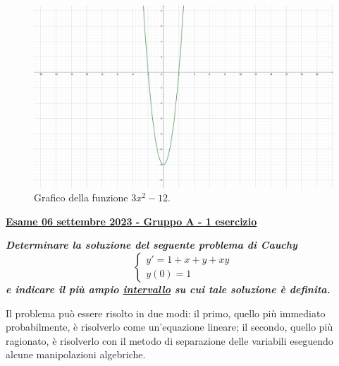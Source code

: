 \documentclass[a4paper]{article}
\newcommand{\definition}[1]{\textcolor{Red3}{\textbf{#1}}}
\newcommand{\example}[1]{\textcolor{Green4}{\textbf{#1}}}
\begin{document}
	\begin{figure}[!htp]
		\centering
		\includegraphics[width=.6\textwidth]{img/exercise/2023-06-21-A-ex1.pdf}
		\caption{Grafico della funzione $3x^{2}-12$.}
	\end{figure}\newpage

	\begin{flushleft}
		\label{exam: esame 06 settembre 2023 - Gruppo A - 1 esercizio}
		\hypertarget{
			exam: esame 06 settembre 2023 - Gruppo A - 1 esercizio
		}{
			\definition{\underline{Esame 06 settembre 2023 - Gruppo A - 1 esercizio}}
		}
	\end{flushleft}
	\example{\emph{Determinare la soluzione del seguente problema di Cauchy}
	\begin{equation*}
		\begin{cases}
			y' = 1 + x + y + xy \\
			y\left(0\right) = 1
		\end{cases}
	\end{equation*}
	\emph{e indicare il più ampio \underline{intervallo} su cui tale soluzione è definita.}}\newline

	\noindent
	Il problema può essere risolto in due modi: il primo, quello più immediato probabilmente, è risolverlo come un'equazione lineare; il secondo, quello più ragionato, è risolverlo con il metodo di separazione delle variabili eseguendo alcune manipolazioni algebriche.\newline
\end{document}
